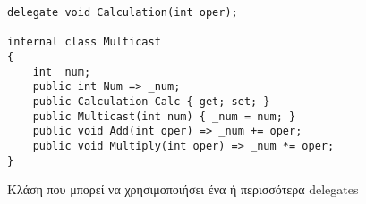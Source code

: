 \begin{listing}[htbp]
\begin{verbatim}
delegate void Calculation(int oper);

internal class Multicast
{
    int _num;
    public int Num => _num;
    public Calculation Calc { get; set; }
    public Multicast(int num) { _num = num; }
    public void Add(int oper) => _num += oper;
    public void Multiply(int oper) => _num *= oper;
}
\end{verbatim}
\caption{Κλάση που μπορεί να χρησιμοποιήσει ένα ή περισσότερα delegates}
\label{multicast}
\end{listing}